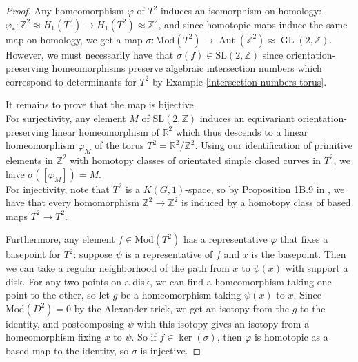 \documentclass[reqno]{amsart}
\theoremstyle{definition}
\theoremstyle{remark}
\DeclareMathOperator{\Aut}{Aut}
\DeclareMathOperator{\GL}{GL}
\newcommand{\SL}{{\mathrm{SL}}}
\newcommand{\Mod}{{\mathrm{Mod}}}
\begin{document}
\begin{proof}
    Any homeomorphism $\varphi $ of $T^2$ induces
    an isomorphism on homology: $\varphi_* \colon
    \mathbb{Z}^2 \approx H_1 (T^2) \to H_1\left( T^2 \right) 
    \approx \mathbb{Z}^2$, and
    since homotopic maps induce
    the same map on homology,
    we get a map
    $\sigma \colon \Mod \left( T^2 \right) 
    \to \Aut\left( \mathbb{Z}^2 \right) 
    \approx
    \GL \left( 2,\mathbb{Z} \right) $.
    However, we must necessarily have that
    $\sigma (f) \in \SL(2,\mathbb{Z})$ since
    orientation-preserving homeomorphisms
    preserve algebraic intersection numbers
    which correspond to determinants 
    for $T^2$ by Example \ref{intersection-numbers-torus}.
    
    It remains to prove that the map is bijective.\\
    

    For surjectivity, any element $M$ of
    $\SL \left( 2,\mathbb{Z} \right) $ induces
    an equivariant orientation-preserving linear homeomorphism
    of $\mathbb{R}^2$ which thus descends
    to a linear homeomorphism
    $\varphi_{M}$ of the torus $T^2 = \mathbb{R}^2
    / \mathbb{Z}^2$. Using our identification
    of primitive elements in $\mathbb{Z}^2$ with
    homotopy classes of orientated simple closed
    curves in $T^2$, we have
    $\sigma \left( \left[ \varphi_M \right]  \right) =M$.\\
    

    For injectivity, note that
    $T^2$ is a $K\left( G,1 \right) $-space, so
    by Proposition 1B.9 in \cite{Hatcher}, we have
    that every homomorphism
    $ \mathbb{Z}^2 \to \mathbb{Z}^2 $ is induced by
    a homotopy class of based maps
    $T^2 \to T^2$.\todo{}

    Furthermore, any element $f \in \Mod \left( T^2 \right) $ 
    has a representative $\varphi $ that fixes a basepoint
    for $T^2$:
    suppose
    $\psi $ is a representative
    of $f$ and
    $x$ is the basepoint. Then
    we can take a regular neighborhood of the path from
    $x$ to $\psi (x)$ with support
    a disk. For any two points on a disk, we
    can find a homeomorphism taking one point to the other, so
    let $g$ be a homeomorphism taking
    $\psi (x)$ to $x$.
    Since $\Mod \left( D^2 \right) = 0$ by
    the Alexander trick, we get an
    isotopy from the $g$ to the identity, and
    postcomposing $\psi $ with
    this isotopy gives an isotopy from
    a homeomorphism fixing $x$ to
    $\psi $.
    So if $f \in \ker \left( \sigma \right) $, then
    $\varphi $ is homotopic as a based map to
    the identity, so $\sigma$ is injective. 

\end{proof}
\end{document}
